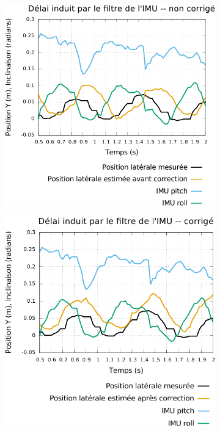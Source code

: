 \begin{figure}[htb]
    \centerfloat
    \begin{subfigure}{0.4\paperwidth}
        \centering
        \includegraphics[type=pdf,ext=.pdf,read=.pdf,width=1.0\linewidth]{../plot/OdometryLWPR/grass_open_delay_imu_uncorrected}
    \end{subfigure}
    \begin{subfigure}{0.4\paperwidth}
        \centering
        \includegraphics[type=pdf,ext=.pdf,read=.pdf,width=1.0\linewidth]{../plot/OdometryLWPR/grass_open_delay_imu_corrected}

\end{subfigure}
\end{figure}
